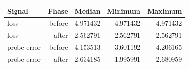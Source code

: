 \begin{tabular}{lrrrr}
\toprule
Signal & Phase & Median & Minimum & Maximum \\
\midrule
loss & before & 4.971432 & 4.971432 & 4.971432 \\
loss & after & 2.562791 & 2.562791 & 2.562791 \\
probe error & before & 4.153513 & 3.601192 & 4.206165 \\
probe error & after & 2.634185 & 1.995991 & 2.680959 \\
\bottomrule
\end{tabular}
